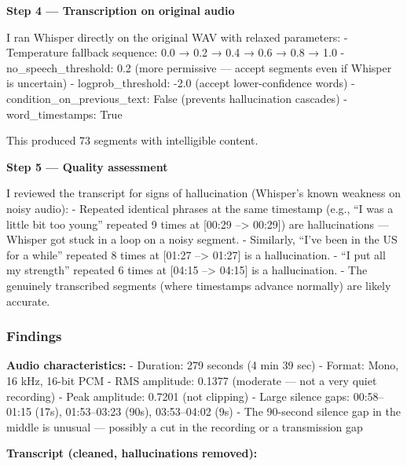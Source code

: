 \documentclass[
]{article}
\begin{document}
\textbf{Step 4 --- Transcription on original audio}

I ran Whisper directly on the original WAV with relaxed parameters: -
Temperature fallback sequence: 0.0 → 0.2 → 0.4 → 0.6 → 0.8 → 1.0 -
no\_speech\_threshold: 0.2 (more permissive --- accept segments even if
Whisper is uncertain) - logprob\_threshold: -2.0 (accept
lower-confidence words) - condition\_on\_previous\_text: False (prevents
hallucination cascades) - word\_timestamps: True

This produced 73 segments with intelligible content.

\textbf{Step 5 --- Quality assessment}

I reviewed the transcript for signs of hallucination (Whisper's known
weakness on noisy audio): - Repeated identical phrases at the same
timestamp (e.g., ``I was a little bit too young'' repeated 9 times at
{[}00:29 --\textgreater{} 00:29{]}) are hallucinations --- Whisper got
stuck in a loop on a noisy segment. - Similarly, ``I've been in the US
for a while'' repeated 8 times at {[}01:27 --\textgreater{} 01:27{]} is
a hallucination. - ``I put all my strength'' repeated 6 times at
{[}04:15 --\textgreater{} 04:15{]} is a hallucination. - The genuinely
transcribed segments (where timestamps advance normally) are likely
accurate.

\subsubsection{Findings}\label{findings}

\textbf{Audio characteristics:} - Duration: 279 seconds (4 min 39 sec) -
Format: Mono, 16 kHz, 16-bit PCM - RMS amplitude: 0.1377 (moderate ---
not a very quiet recording) - Peak amplitude: 0.7201 (not clipping) -
Large silence gaps: 00:58--01:15 (17s), 01:53--03:23 (90s), 03:53--04:02
(9s) - The 90-second silence gap in the middle is unusual --- possibly a
cut in the recording or a transmission gap

\textbf{Transcript (cleaned, hallucinations removed):}
\end{document}
